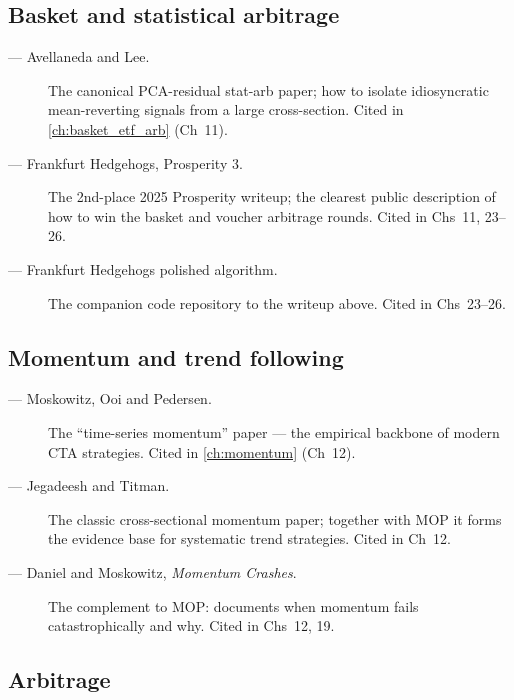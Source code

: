 \subsection{Basket and statistical arbitrage}

\begin{description}
  \item[\citet{avellaneda2010stat} --- Avellaneda and Lee.] The
    canonical PCA-residual stat-arb paper; how to isolate
    idiosyncratic mean-reverting signals from a large cross-section.
    Cited in \cref{ch:basket_etf_arb} (Ch~11).
  \item[\citet{frankfurthedgehogs2025} --- Frankfurt Hedgehogs,
    Prosperity 3.] The 2nd-place 2025 Prosperity writeup; the
    clearest public description of how to win the basket and
    voucher arbitrage rounds. Cited in Chs~11, 23--26.
  \item[\citet{frankfurtHedgehogs2025imcP3} --- Frankfurt Hedgehogs
    polished algorithm.] The companion code repository to the
    writeup above. Cited in Chs~23--26.
\end{description}

\subsection{Momentum and trend following}

\begin{description}
  \item[\citet{moskowitz2012time} --- Moskowitz, Ooi and Pedersen.]
    The ``time-series momentum'' paper --- the empirical backbone of
    modern CTA strategies. Cited in \cref{ch:momentum} (Ch~12).
  \item[\citet{jegadeesh1993} --- Jegadeesh and Titman.] The classic
    cross-sectional momentum paper; together with MOP it forms the
    evidence base for systematic trend strategies. Cited in Ch~12.
  \item[\citet{daniel2016momentum} --- Daniel and Moskowitz,
    \emph{Momentum Crashes}.] The complement to MOP: documents when
    momentum fails catastrophically and why. Cited in Chs~12, 19.
\end{description}

\subsection{Arbitrage}


